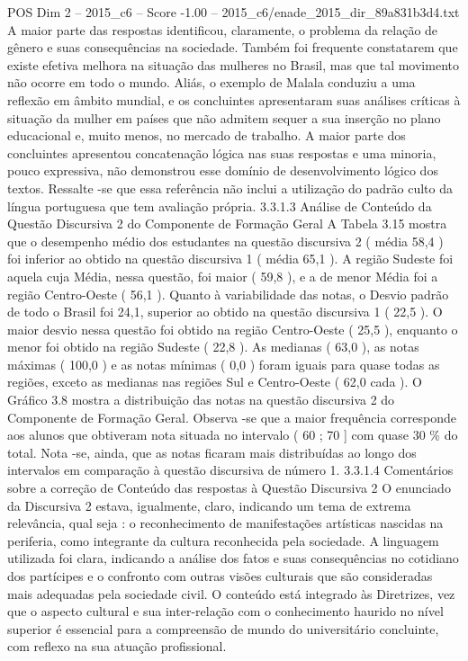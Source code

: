 \begin{textsample}{POS Dim 2 – 2015\_c6 – Score -1.00 – 2015\_c6/enade\_2015\_dir\_89a831b3d4.txt}
A maior parte das respostas identificou, claramente, o problema da relação de gênero e suas consequências na sociedade.
Também foi frequente constatarem que existe efetiva melhora na situação das mulheres no Brasil, mas que tal movimento não ocorre em todo o mundo.
Aliás, o exemplo de Malala conduziu a uma reflexão em âmbito mundial, e os concluintes apresentaram suas análises críticas à situação da mulher em países que não admitem sequer a sua inserção no plano educacional e, muito menos, no mercado de trabalho.
A maior parte dos concluintes apresentou concatenação lógica nas suas respostas e uma minoria, pouco expressiva, não demonstrou esse domínio de desenvolvimento lógico dos textos.
Ressalte -se que essa referência não inclui a utilização do padrão culto da língua portuguesa que tem avaliação própria. 3.3.1.3 Análise de Conteúdo da Questão Discursiva 2 do Componente de Formação Geral A Tabela 3.15 mostra que o desempenho médio dos estudantes na questão discursiva 2 ( média 58,4 ) foi inferior ao obtido na questão discursiva 1 ( média 65,1 ).
A região Sudeste foi aquela cuja Média, nessa questão, foi maior ( 59,8 ), e a de menor Média foi a região Centro-Oeste ( 56,1 ).
Quanto à variabilidade das notas, o Desvio padrão de todo o Brasil foi 24,1, superior ao obtido na questão discursiva 1 ( 22,5 ).
O maior desvio nessa questão foi obtido na região Centro-Oeste ( 25,5 ), enquanto o menor foi obtido na região Sudeste ( 22,8 ).
As medianas ( 63,0 ), as notas máximas ( 100,0 ) e as notas mínimas ( 0,0 ) foram iguais para quase todas as regiões, exceto as medianas nas regiões Sul e Centro-Oeste ( 62,0 cada ).
O Gráfico 3.8 mostra a distribuição das notas na questão discursiva 2 do Componente de Formação Geral.
Observa -se que a maior frequência corresponde aos alunos que obtiveram nota situada no intervalo ( 60 ; 70 ] com quase 30 \% do total.
Nota -se, ainda, que as notas ficaram mais distribuídas ao longo dos intervalos em comparação à questão discursiva de número 1. 3.3.1.4 Comentários sobre a correção de Conteúdo das respostas à Questão Discursiva 2 O enunciado da Discursiva 2 estava, igualmente, claro, indicando um tema de extrema relevância, qual seja : o reconhecimento de manifestações artísticas nascidas na periferia, como integrante da cultura reconhecida pela sociedade.
A linguagem utilizada foi clara, indicando a análise dos fatos e suas consequências no cotidiano dos partícipes e o confronto com outras visões culturais que são consideradas mais adequadas pela sociedade civil.
O conteúdo está integrado às Diretrizes, vez que o aspecto cultural e sua inter-relação com o conhecimento haurido no nível superior é essencial para a compreensão de mundo do universitário concluinte, com reflexo na sua atuação profissional.

\end{textsample}
